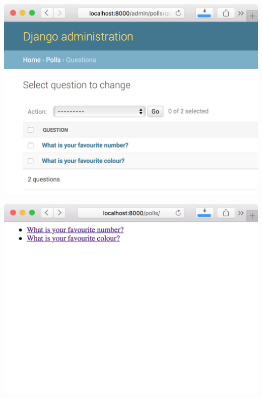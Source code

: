 \documentclass[xcolor=svgnames,17pt]{beamer}
\begin{document}
\begin{frame}[plain]
\includegraphics[width=0.95\paperwidth,center]{polls1.png}
\end{frame}

\begin{frame}[plain]
\includegraphics[width=0.95\paperwidth,center]{polls2.png}
\end{frame}
\end{document}
